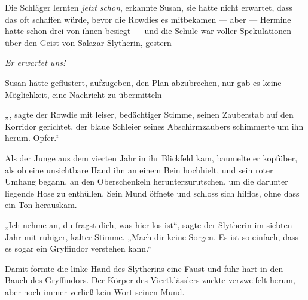 Die Schläger lernten \emph{jetzt} \emph{schon}, erkannte Susan, sie hatte nicht erwartet, dass \SPHEW das oft schaffen würde, bevor die Rowdies es mitbekamen — aber — Hermine hatte schon drei von ihnen besiegt — und die Schule war voller Spekulationen über den Geist von Salazar Slytherin, gestern —

\emph{Er erwartet uns!}

Susan hätte geflüstert, aufzugeben, den Plan abzubrechen, nur gab es keine Möglichkeit, eine Nachricht zu übermitteln —

„{}, sagte der Rowdie mit leiser, bedächtiger Stimme, seinen Zauberstab auf den Korridor gerichtet, der blaue Schleier seines Abschirmzaubers schimmerte um ihn herum.  Opfer.“

Als der Junge aus dem vierten Jahr in ihr Blickfeld kam, baumelte er kopfüber, als ob eine unsichtbare Hand ihn an einem Bein hochhielt, und sein roter Umhang begann, an den Oberschenkeln herunterzurutschen, um die darunter liegende Hose zu enthüllen. Sein Mund öffnete und schloss sich hilflos, ohne dass ein Ton herauskam.

„Ich nehme an, du fragst dich, was hier los ist“, sagte der Slytherin im siebten Jahr mit ruhiger, kalter Stimme.
„Mach dir keine Sorgen. Es ist so einfach, dass es sogar ein Gryffindor verstehen kann.“

Damit formte die linke Hand des Slytherins eine Faust und fuhr hart in den Bauch des Gryffindors. Der Körper des Viertklässlers zuckte verzweifelt herum, aber noch immer verließ kein Wort seinen Mund.


